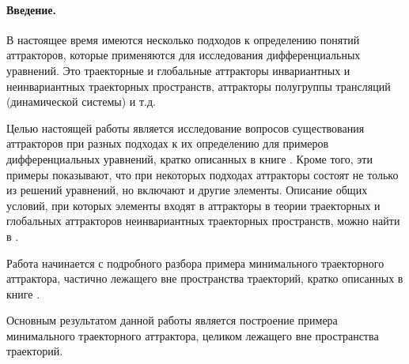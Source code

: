 
\LARGE





\paragraph{Введение.}
В настоящее время имеются несколько подходов к определению понятий аттракторов,
которые применяются для исследования дифференциальных уравнений.
Это траекторные и глобальные аттракторы инвариантных и неинвариантных траекторных пространств,
аттракторы полугруппы трансляций (динамической системы) и т.д.

Целью настоящей работы является исследование
вопросов существования аттракторов
при разных подходах к их определению для примеров дифференциальных уравнений,
кратко описанных в книге \cite{Vorotnikov}.
Кроме того, эти примеры показывают,
что при некоторых подходах аттракторы состоят не только из решений уравнений,
но включают и другие элементы.
Описание общих условий,
при которых элементы входят в аттракторы в теории траекторных и
глобальных аттракторов неинвариантных траекторных пространств,
можно найти в \cite{Kondratyev}.

Работа начинается с подробного разбора примера минимального траекторного аттрактора,
частично лежащего вне пространства траекторий,
кратко описанных в книге \cite{Vorotnikov}.

Основным результатом данной работы является построение примера минимального траекторного аттрактора,
целиком лежащего вне пространства траекторий.




